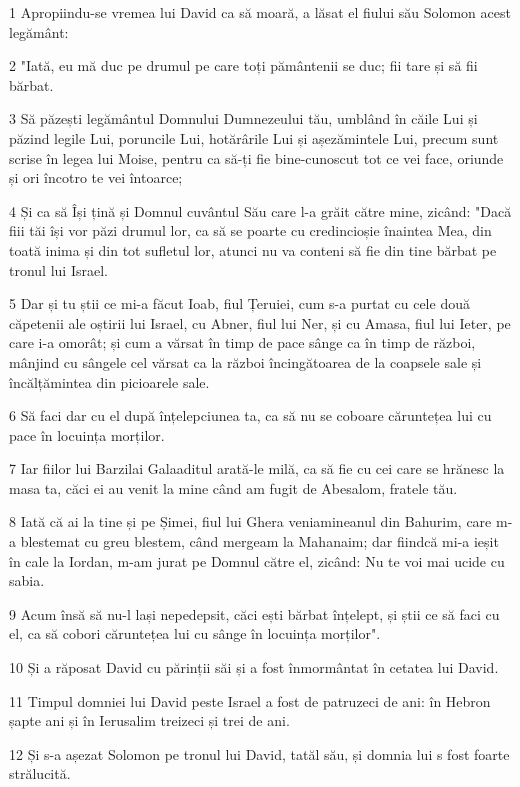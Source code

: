 \par 1 Apropiindu-se vremea lui David ca să moară, a lăsat el fiului său Solomon acest legământ:
\par 2 "Iată, eu mă duc pe drumul pe care toți pământenii se duc; fii tare și să fii bărbat.
\par 3 Să păzești legământul Domnului Dumnezeului tău, umblând în căile Lui și păzind legile Lui, poruncile Lui, hotărârile Lui și așezămintele Lui, precum sunt scrise în legea lui Moise, pentru ca să-ți fie bine-cunoscut tot ce vei face, oriunde și ori încotro te vei întoarce;
\par 4 Și ca să Își țină și Domnul cuvântul Său care l-a grăit către mine, zicând: "Dacă fiii tăi își vor păzi drumul lor, ca să se poarte cu credincioșie înaintea Mea, din toată inima și din tot sufletul lor, atunci nu va conteni să fie din tine bărbat pe tronul lui Israel.
\par 5 Dar și tu știi ce mi-a făcut Ioab, fiul Țeruiei, cum s-a purtat cu cele două căpetenii ale oștirii lui Israel, cu Abner, fiul lui Ner, și cu Amasa, fiul lui Ieter, pe care i-a omorât; și cum a vărsat în timp de pace sânge ca în timp de război, mânjind cu sângele cel vărsat ca la război încingătoarea de la coapsele sale și încălțămintea din picioarele sale.
\par 6 Să faci dar cu el după înțelepciunea ta, ca să nu se coboare căruntețea lui cu pace în locuința morților.
\par 7 Iar fiilor lui Barzilai Galaaditul arată-le milă, ca să fie cu cei care se hrănesc la masa ta, căci ei au venit la mine când am fugit de Abesalom, fratele tău.
\par 8 Iată că ai la tine și pe Șimei, fiul lui Ghera veniamineanul din Bahurim, care m-a blestemat cu greu blestem, când mergeam la Mahanaim; dar fiindcă mi-a ieșit în cale la Iordan, m-am jurat pe Domnul către el, zicând: Nu te voi mai ucide cu sabia.
\par 9 Acum însă să nu-l lași nepedepsit, căci ești bărbat înțelept, și știi ce să faci cu el, ca să cobori căruntețea lui cu sânge în locuința morților".
\par 10 Și a răposat David cu părinții săi și a fost înmormântat în cetatea lui David.
\par 11 Timpul domniei lui David peste Israel a fost de patruzeci de ani: în Hebron șapte ani și în Ierusalim treizeci și trei de ani.
\par 12 Și s-a așezat Solomon pe tronul lui David, tatăl său, și domnia lui s fost foarte strălucită.
